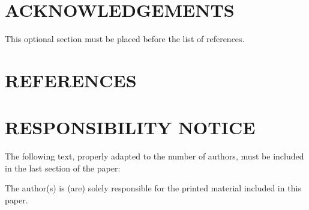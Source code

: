 \documentclass[10pt,fleqn,a4paper,twoside]{article}
\begin{document}
\smallskip



\section{ACKNOWLEDGEMENTS}
This optional section must be placed before the list of references.

\section{REFERENCES} 
\label{Sec:references}


\renewcommand{\refname}{}




\section{RESPONSIBILITY NOTICE}
The following text, properly adapted to the number of authors, must be included in the last section of the paper:

The author(s) is (are) solely responsible for the printed material included in this paper.
\end{document}
